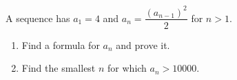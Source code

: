 A sequence has $a_1=4$ and $a_n=\dfrac{\left(a_{n-1}\right)^2}{2}$ for $n>1$.
\begin{enumerate}
\item[(a)] Find a formula for $a_n$ and prove it.
\item[(b)] Find the smallest $n$ for which $a_n>10000$.
\end{enumerate}
